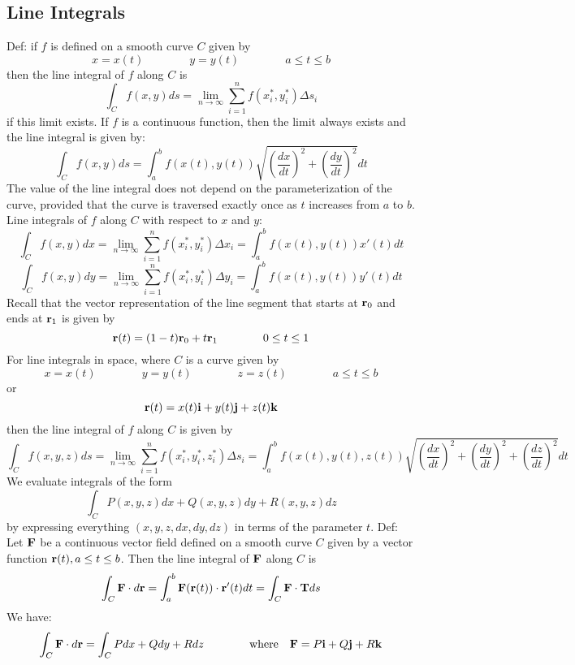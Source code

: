\documentclass{article}
\begin{document}
    \subsection{Line Integrals}
    \begin{outline}
        \1 Def: if $f$ is defined on a smooth curve $C$ given by \[x=x(t)\qquad\qquad y=y(t)\qquad\qquad a\leq t\leq b\] then the line integral of $f$ along $C$ is \[\int_Cf(x,y)ds=\lim_{n\to\infty}\sum^n_{i=1}f(x^*_i,y^*_i)\Delta s_i\] if this limit exists. 
        \1 If $f$ is a continuous function, then the limit always exists and the line integral is given by: \[\int_Cf(x,y)ds=\int^b_af(x(t),y(t))\sqrt{\left(\dfrac{dx}{dt}\right)^2+\left(\dfrac{dy}{dt}\right)^2}dt\] The value of the line integral does not depend on the parameterization of the curve, provided that the curve is traversed exactly once as $t$ increases from $a$ to $b$. 
        \1 Line integrals of $f$ along $C$ with respect to $x$ and $y$: \[\int_Cf(x,y)dx=\lim_{n\to\infty}\sum^n_{i=1}f(x^*_i,y^*_i)\Delta x_i=\int_a^bf(x(t),y(t))x'(t)dt\] \[\int_Cf(x,y)dy=\lim_{n\to\infty}\sum^n_{i=1}f(x^*_i,y^*_i)\Delta y_i=\int_a^bf(x(t),y(t))y'(t)dt\]
        \1 Recall that the vector representation of the line segment that starts at \(\vb r_0\) and ends at \(\vb r_1\) is given by \[\vb r(t)=(1-t)\vb r_0+t\vb r_1\qquad\qquad 0\leq t\leq 1\]
        \1 For line integrals in space, where $C$ is a curve given by \[x=x(t)\qquad\qquad y=y(t)\qquad\qquad z=z(t)\qquad\qquad a\leq t\leq b\] or \[\vb r(t)=x(t)\vb i+y(t)\vb j+z(t)\vb k\] then the line integral of $f$ along $C$ is given by \[\int_Cf(x,y,z)ds=\lim_{n\to\infty}\sum^n_{i=1}f(x^*_i,y^*_i,z^*_i)\Delta s_i=\int_a^bf(x(t),y(t),z(t))\sqrt{\left(\dfrac{dx}{dt}\right)^2+\left(\dfrac{dy}{dt}\right)^2+\left(\dfrac{dz}{dt}\right)^2}dt\]
        \1 We evaluate integrals of the form \[\int_CP(x,y,z)dx+Q(x,y,z)dy+R(x,y,z)dz\] by expressing everything \((x,y,z,dx,dy,dz)\) in terms of the parameter $t$. 
        \1 Def: Let \(\vb F\) be a continuous vector field defined on a smooth curve $C$ given by a vector function \(\vb r(t),a\leq t\leq b\). Then the line integral of $\vb F$ along $C$ is \[\int_C\vb F\cdot d\vb r=\int_a^b\vb F(\vb r(t))\cdot\vb r'(t)dt=\int_C\vb F\cdot\vb Tds\]
        \1 We have: \[\int_C\vb F\cdot d\vb r=\int_CPdx+Qdy+Rdz\qquad\qquad\text{where}\quad\vb F=P\vb i+Q\vb j+R\vb k\]

    \end{outline}
\end{document}

